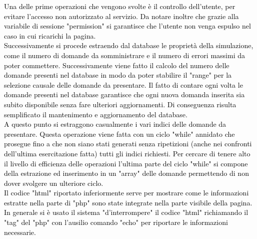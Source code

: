 \raggedright
\textcolor{black}{Una delle prime operazioni che vengono svolte è il controllo dell'utente, per evitare l'accesso non autorizzato al servizio. Da notare inoltre che grazie alla variabile di sessione "permission" si garantisce che l'utente non venga espulso nel caso in cui ricarichi la pagina.\\
Successivamente si procede estraendo dal database le proprietà della simulazione, come il numero di domande da somministrare e il numero di errori massimi da poter commettere. Successivamente viene fatto il calcolo del numero delle domande presenti nel database in modo da poter stabilire il "range" per la selezione causale delle domande da presentare. Il fatto di contare ogni volta le domande presenti nel database garantisce che ogni nuova domanda inserita sia subito disponibile senza fare ulteriori aggiornamenti. Di conseguenza risulta semplificato il mantenimento e aggiornamento del database.\\
A questo punto si estraggono casualmente i vari indici delle domande da presentare. Questa operazione viene fatta con un ciclo "while" annidato che prosegue fino a che non siano stati generati senza ripetizioni (anche nei confronti dell'ultima esercitazione fatta) tutti gli indici richiesti. Per cercare di tenere alto il livello di efficienza delle operazioni l'ultima parte del ciclo "while" si compone della estrazione ed inserimento in un "array" delle domande permettendo di non dover svolgere un ulteriore ciclo.}\\
\bigskip
\textcolor{black}{Il codice "html" riportato inferiormente serve per mostrare come le informazioni estratte nella parte di "php" sono state integrate nella parte visibile della pagina. In generale si è usato il sistema "d'interrompere" il codice "html" richiamando il "tag" del "php" con l'ausilio comando "echo" per riportare le informazioni necessarie.}\\

